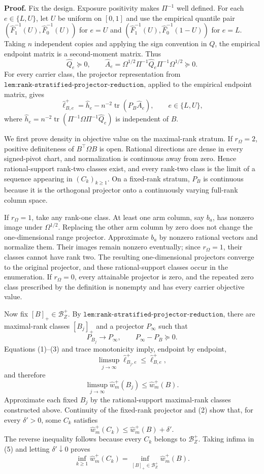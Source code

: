 \textbf{Proof.}
Fix the design.  Exposure positivity makes \(\Pi^{-1}\) well defined.  For each \(e\in\{L,U\}\), let \(U\) be uniform on \([0,1]\) and use the empirical quantile pair \((\widehat F_1^{-1}(U),\widehat F_0^{-1}(U))\) for \(e=U\) and \((\widehat F_1^{-1}(U),\widehat F_0^{-1}(1-U))\) for \(e=L\).  Taking \(n\) independent copies and applying the sign convention in \(Q\), the empirical endpoint matrix is a second-moment matrix.  Thus
\[
\widehat Q_e\succeq0,
\qquad
\widehat A_e
=\Omega^{1/2}\Pi^{-1}\widehat Q_e\Pi^{-1}\Omega^{1/2}
\succeq0.
\tag{1}
\]
For every carrier class, the projector representation from \(\texttt{lem:rank-stratified-projector-reduction}\), applied to the empirical endpoint matrix, gives
\[
\widehat\ell_{B,e}^+
=\widehat h_e-n^{-2}\operatorname{tr}(P_B\widehat A_e),
\qquad e\in\{L,U\},
\tag{2}
\]
where \(\widehat h_e=n^{-2}\operatorname{tr}(\Pi^{-1}\Omega\Pi^{-1}\widehat Q_e)\) is independent of \(B\).

We first prove density in objective value on the maximal-rank stratum.  If \(r_\Omega=2\), positive definiteness of \(B^{\top}\Omega B\) is open.  Rational directions are dense in every signed-pivot chart, and normalization is continuous away from zero.  Hence rational-support rank-two classes exist, and every rank-two class is the limit of a sequence appearing in \((C_k)_{k\ge1}\).  On a fixed-rank stratum, \(P_B\) is continuous because it is the orthogonal projector onto a continuously varying full-rank column space.

If \(r_\Omega=1\), take any rank-one class.  At least one arm column, say \(b_a\), has nonzero image under \(\Omega^{1/2}\).  Replacing the other arm column by zero does not change the one-dimensional range projector.  Approximate \(b_a\) by nonzero rational vectors and normalize them.  Their images remain nonzero eventually; since \(r_\Omega=1\), their classes cannot have rank two.  The resulting one-dimensional projectors converge to the original projector, and these rational-support classes occur in the enumeration.  If \(r_\Omega=0\), every attainable projector is zero, and the repeated zero class prescribed by the definition is nonempty and has every carrier objective value.

Now fix \([B]_+\in\mathcal B_Z^+\).  By \(\texttt{lem:rank-stratified-projector-reduction}\), there are maximal-rank classes \([B_j]_+\) and a projector \(P_\infty\) such that
\[
P_{B_j}\longrightarrow P_\infty,
\qquad P_\infty-P_B\succeq0.
\tag{3}
\]
Equations (1)--(3) and trace monotonicity imply, endpoint by endpoint,
\[
\limsup_{j\to\infty}\widehat\ell_{B_j,e}^+
\le \widehat\ell_{B,e}^+,
\]
and therefore
\[
\limsup_{j\to\infty}\widehat w_m^+(B_j)
\le \widehat w_m^+(B).
\tag{4}
\]
Approximate each fixed \(B_j\) by the rational-support maximal-rank classes constructed above.  Continuity of the fixed-rank projector and (2) show that, for every \(\delta'>0\), some \(C_k\) satisfies
\[
\widehat w_m^+(C_k)
\le \widehat w_m^+(B)+\delta'.
\tag{5}
\]
The reverse inequality follows because every \(C_k\) belongs to \(\mathcal B_Z^+\).  Taking infima in (5) and letting \(\delta'\downarrow0\) proves
\[
\inf_{k\ge1}\widehat w_m^+(C_k)
=\inf_{[B]_+\in\mathcal B_Z^+}\widehat w_m^+(B).
\tag{6}
\]

